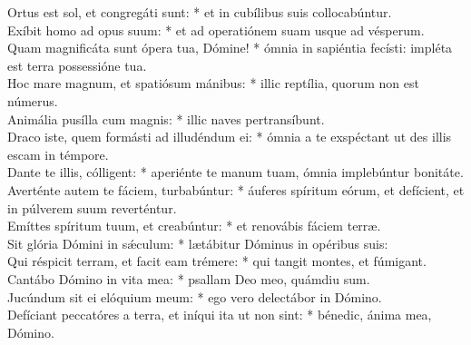 {	Ortus est sol, et congregáti sunt: * et in cubílibus suis collocabúntur. \\
	Exíbit homo ad opus suum: * et ad operatiónem suam usque ad vésperum. \\
	Quam magnificáta sunt ópera tua, Dómine! * ómnia in sapiéntia fecísti: impléta est terra possessióne tua. \\
	Hoc mare magnum, et spatiósum mánibus: * illic reptília, quorum non est númerus. \\
	Animália pusílla cum magnis: * illic naves pertransíbunt. \\
	Draco iste, quem formásti ad illudéndum ei: * ómnia a te exspéctant ut des illis escam in témpore. \\
	Dante te illis, cólligent: * aperiénte te manum tuam, ómnia implebúntur bonitáte. \\
	Averténte autem te fáciem, turbabúntur: * áuferes spíritum eórum, et defícient, et in púlverem suum reverténtur. \\
	Emíttes spíritum tuum, et creabúntur: * et renovábis fáciem terræ. \\
	Sit glória Dómini in sǽculum: * lætábitur Dóminus in opéribus suis: \\
	Qui réspicit terram, et facit eam trémere: * qui tangit montes, et fúmigant. \\
	Cantábo Dómino in vita mea: * psallam Deo meo, quámdiu sum. \\
	Jucúndum sit ei elóquium meum: * ego vero delectábor in Dómino. \\
	Defíciant peccatóres a terra, et iníqui ita ut non sint: * bénedic, ánima mea, Dómino. \\
}

